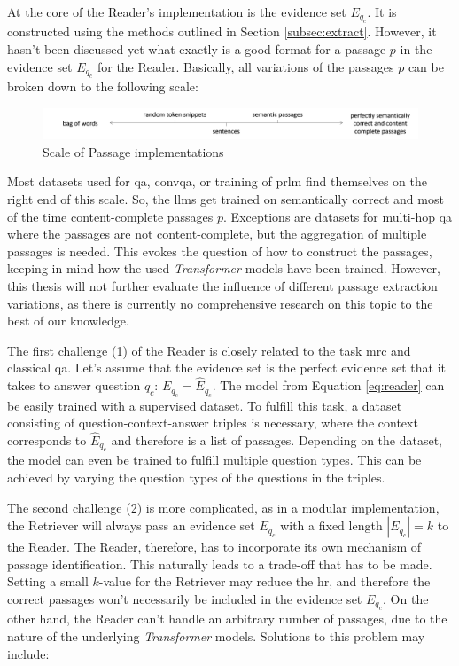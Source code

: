 At the core of the Reader's implementation is the evidence set $E_{q_c}$. It is constructed using the methods outlined in Section \ref{subsec:extract}. However, it hasn't been discussed yet what exactly is a good format for a passage $p$ in the evidence set $E_{q_c}$ for the Reader. Basically, all variations of the passages $p$ can be broken down to the following scale:

\begin{figure}[H]
    \centering
    \includegraphics[width=1\textwidth]{Grafiken/Scale_Passages.png}
    \caption{Scale of Passage implementations}
    \label{fig:scale-passages-implementation}
\end{figure}

Most datasets used for \gls{qa}, \gls{convqa}, or training of \gls{prlm} find themselves on the right end of this scale. So, the \gls{llm}s get trained on semantically correct and most of the time content-complete passages $p$. Exceptions are datasets for multi-hop \gls{qa} where the passages are not content-complete, but the aggregation of multiple passages is needed. This evokes the question of how to construct the passages, keeping in mind how the used \textit{Transformer} models have been trained. However, this thesis will not further evaluate the influence of different passage extraction variations, as there is currently no comprehensive research on this topic to the best of our knowledge.

The first challenge (1) of the Reader is closely related to the task \gls{mrc} and classical \gls{qa}. Let's assume that the evidence set is the perfect evidence set that it takes to answer question $q_c$: $E_{q_c} = \hat{E}_{q_c}$. The model from Equation \ref{eq:reader} can be easily trained with a supervised dataset. To fulfill this task, a dataset consisting of question-context-answer triples is necessary, where the context corresponds to $\hat{E}_{q_c}$ and therefore is a list of passages. Depending on the dataset, the model can even be trained to fulfill multiple question types. This can be achieved by varying the question types of the questions in the triples.

The second challenge (2) is more complicated, as in a modular implementation, the Retriever will always pass an evidence set $E_{q_c}$ with a fixed length $|E_{q_c}| = k$ to the Reader. The Reader, therefore, has to incorporate its own mechanism of passage identification. This naturally leads to a trade-off that has to be made. Setting a small $k$-value for the Retriever may reduce the \gls{hr}, and therefore the correct passages won't necessarily be included in the evidence set $E_{q_c}$. On the other hand, the Reader can't handle an arbitrary number of passages, due to the nature of the underlying \textit{Transformer} models. Solutions to this problem may include:

